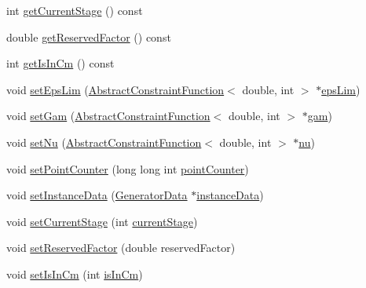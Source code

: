 \begin{DoxyCompactItemize}
\item 
int \hyperlink{class_abstract_object_c_c_o_tree_a898a98d082f14787fab5f33f8434145e}{get\+Current\+Stage} () const 
\item 
double \hyperlink{class_abstract_object_c_c_o_tree_a1003fc21c6c57a304a5c3c21e03874c4}{get\+Reserved\+Factor} () const 
\item 
int \hyperlink{class_abstract_object_c_c_o_tree_aafb42089563028d4a427c4c3ee4b96b1}{get\+Is\+In\+Cm} () const 
\item 
void \hyperlink{class_abstract_object_c_c_o_tree_aad766c18effb679595d7c2fbae12006a}{set\+Eps\+Lim} (\hyperlink{class_abstract_constraint_function}{Abstract\+Constraint\+Function}$<$ double, int $>$ $\ast$\hyperlink{class_abstract_object_c_c_o_tree_a62d3e1ff7e74a6236422273f58fc6012}{eps\+Lim})
\item 
void \hyperlink{class_abstract_object_c_c_o_tree_a0d5c2d87afe1bff8f5e2e2bb25baccde}{set\+Gam} (\hyperlink{class_abstract_constraint_function}{Abstract\+Constraint\+Function}$<$ double, int $>$ $\ast$\hyperlink{class_abstract_object_c_c_o_tree_aad315b93744637e18153c4434dac067d}{gam})
\item 
void \hyperlink{class_abstract_object_c_c_o_tree_a5c697dca9b49016e8dddc1af43cf0d20}{set\+Nu} (\hyperlink{class_abstract_constraint_function}{Abstract\+Constraint\+Function}$<$ double, int $>$ $\ast$\hyperlink{class_abstract_object_c_c_o_tree_a92e6b6d1a2fac7331eee34fb28158828}{nu})
\item 
void \hyperlink{class_abstract_object_c_c_o_tree_a53deb35aacf40244e396772bc151b3c3}{set\+Point\+Counter} (long long int \hyperlink{class_abstract_object_c_c_o_tree_a8d8512b976d31017c242e229dafebd0a}{point\+Counter})
\item 
void \hyperlink{class_abstract_object_c_c_o_tree_ab0422503ddc24447e752c73d20a51887}{set\+Instance\+Data} (\hyperlink{class_generator_data}{Generator\+Data} $\ast$\hyperlink{class_abstract_object_c_c_o_tree_aca7aecbd89dadc46dd9dce14cfde31e1}{instance\+Data})
\item 
void \hyperlink{class_abstract_object_c_c_o_tree_aa7e666d1d2736f69aae81e24481497db}{set\+Current\+Stage} (int \hyperlink{class_abstract_object_c_c_o_tree_a3597fe2e3dd70d3da743674eb91c2831}{current\+Stage})
\item 
void \hyperlink{class_abstract_object_c_c_o_tree_aa88bb0f5894cad8b52d6a93b57355b52}{set\+Reserved\+Factor} (double reserved\+Factor)
\item 
void \hyperlink{class_abstract_object_c_c_o_tree_a22155ce4ec3b74fa28635bf4e4de9c99}{set\+Is\+In\+Cm} (int \hyperlink{class_abstract_object_c_c_o_tree_a11ab0fe8d03165bcbf23bc3cca75cafc}{is\+In\+Cm})
\end{DoxyCompactItemize}
